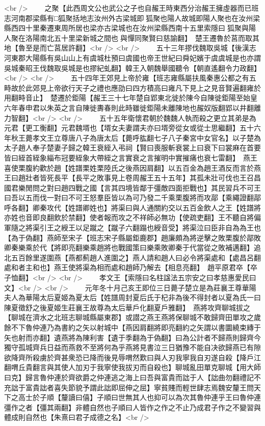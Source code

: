 <br />
　　之聚【此西周文公也武公之子也自赧王時東西分治赧王擁虛器而已班志河南郡梁縣有□狐聚括地志汝州外古梁城即狐聚也陽人故城即陽人聚也在汝州梁縣西四十里秦遷東周所居也梁亦古梁城也在汝州梁縣西南十五里索隱曰狐聚與陽人聚在洛陽南北五十里梁新城之間也與憚同聚賢曰慈諭翻】　楚王遷魯於莒而取其地【魯至是而亡莒居許翻】<br />
<br />
　　五十三年摎伐魏取吳城【後漢志河東郡大陽縣有吳山山上有虞城杜預曰虞國也帝王世紀曰舜妃嬪于虞虞城是也亦謂吳城秦昭王伐魏取吳城是也摎紀虬翻】韓王入朝魏舉國聽令【朝直遙翻令力政翻】<br />
<br />
　　五十四年王郊見上帝於雍【班志雍縣屬扶風秦惠公都之有五畤故於此郊見上帝欲行天子之禮也應劭曰四方積高曰雍凡下見上之見音賢遍翻雍於用翻畤音止】　楚遷於鉅陽【赧王三十七年楚自郢東北徙於陳今自陳徙鉅陽至始皇六年春申君以朱英之言自陳徙夀春則此時雖徙鉅陽未離陳地也赧奴版翻郢以井翻離力智翻】<br />
<br />
　　五十五年衛懷君朝於魏魏人執而殺之更立其弟是為元君【更工衡翻】元君魏壻也【壻女夫妻謂夫亦曰壻旁從女或從士思繼翻】五十六年秋王薨孝文王立尊唐八子為唐太后【薨呼肱翻七子八子秦宮中女官名】以子楚為太子趙人奉子楚妻子歸之韓王衰絰入弔祠【賢曰喪服斬衰裳上曰衰下曰裳麻在首要皆曰絰首絰象緇布冠要絰象大帶絰之言實衰之言摧明中實摧痛也衰七雷翻】　燕王喜使栗腹約歡於趙【姓譜栗姓栗陸氏之後燕因肩翻】以五百金為趙王酒反而言於燕王曰趙壯者皆死長平【長平之敗事見上卷周赧王五十五年】其孤未壯可伐也王召昌國君樂閒問之對曰趙四戰之國【言其四境皆鄰于彊敵四面拒戰也】其民習兵不可王曰吾以五而伐一對曰不可王怒羣臣皆以為可乃發二千乘栗腹將而攻鄗【乘繩證翻鄗呼各翻】卿秦攻代【姓譜卿姓也】將渠曰與人通關約交以五百金飲人之王【姓譜將亦姓也音即良翻飲於禁翻】使者報而攻之不祥師必無功【使疏吏翻】王不聽自將偏軍隨之將渠引王之綬王以足蹴之【蹴子六翻蹋也綬音受】將渠泣曰臣非自為為王也【為于偽翻】燕師至宋子【班志宋子縣屬鉅鹿郡】趙廉頗為將逆擊之敗栗腹於鄗敗卿秦樂乘於代【將即亮翻樂乘趙將也戰國策曰樂乘敗卿秦于代當從之敗補邁翻】追北五百餘里遂圍燕【燕都薊趙人進圍之】燕人請和趙人曰必令將渠處和【處昌呂翻處和者主和也】燕王使將渠為相而處和趙師乃解去【相息亮翻】　趙平原君卒【卒子恤翻】<br />
<br />
　　孝文王【索隱曰名柱諡法五宗安之曰孝慈惠愛民曰文】<br />
<br />
　　元年冬十月己亥王即位三日薨子楚立是為莊襄王尊華陽夫人為華陽太后夏姬為夏太后【姓譜周封夏后氏于杞非為後不得封者以夏為氏一曰陳夏徵舒之後夏姬生莊襄王故尊為太后華戶化翻夏戶雅翻】　燕將攻齊聊城拔之【聊城在濟水之北班志聊城縣屬東郡】或譛之燕王燕將保聊城不敢歸齊田單攻之歲餘不下魯仲連乃為書約之矢以射城中【燕因肩翻將即亮翻約之矢謂以書圜繞束縳于矢也射而亦翻】遺燕將為陳利害【遺于季翻為于偽翻】曰為公計者不歸燕則歸齊今獨守孤城齊兵日益而燕救不至將何為乎燕將見書泣三日猶豫不能自决欲歸燕已有隙欲降齊所殺虜於齊甚衆恐已降而後見辱喟然歎曰與人刃我寧我自刃遂自殺【降戶江翻喟丘貴翻言與其使人加刃于我寧使我拔刃而自殺也】聊城亂田單克聊城【用大師曰克】歸言魯仲連於齊欲爵之仲連逃之海上曰吾與富貴而詘于人【詘曲勿翻禮記不充詘于富貴詘者喜失節貌予謂此詘即屈伸之屈】寧貧賤而輕世肆志焉魏安釐王問天下之高士於子順【釐讀曰僖】子順曰世無其人也抑可以為次其魯仲連乎王曰魯仲連彊作之者【彊其兩翻】非體自然也子順曰人皆作之作之不止乃成君子作之不變習與體成則自然也【朱熹曰君子成德之名】<br />
